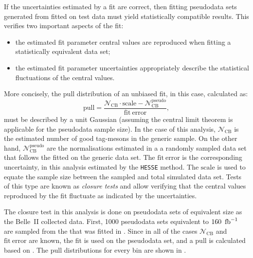 If the uncertainties estimated by a fit are correct, then fitting pseudodata sets generated from  fitted on test data must yield statistically compatible results.
This verifies two important aspects of the fit:
\begin{itemize}
    \item the estimated fit parameter central values are reproduced when fitting a statistically equivalent data set;
    \item the estimated fit parameter uncertainties appropriately describe the statistical fluctuations of the central values.
\end{itemize}

More concisely, the pull distribution of an unbiased fit, in this case, calculated as:
\begin{equation}\label{eq:toy_pull}
    \mathrm{pull} = \frac{\mathcal{N}_{\mathrm{CB}}\cdot \mathrm{scale} - \mathcal{N}_{\mathrm{CB}}^{\mathrm{pseudo}}}{\mathrm{fit~error}},
\end{equation}
must be described by a unit Gaussian (assuming the central limit theorem is applicable for the pseudodata sample size).
In the case of this analysis, $\mathcal{N}_{\mathrm{CB}}$ is the estimated number of good tag-\B mesons in the generic \MC sample.
On the other hand, $\mathcal{N}^{\mathrm{pseudo}}_{\mathrm{CB}}$ are the normalisations estimated in a a randomly sampled data set that follows the  fitted on the generic \MC data set.
The $\mathrm{fit~error}$ is the corresponding uncertainty, in this analysis estimated by the \texttt{HESSE} method.
The $\mathrm{scale}$ is used to equate the sample size between the sampled and total simulated data set.
Tests of this type are known as \textit{closure tests} and allow verifying that the central values reproduced by the fit fluctuate as indicated by the \PDF uncertainties.

The closure test in this analysis is done on pseudodata sets of equivalent size as the Belle~II collected data.
First, 1000 pseudodata sets equivalent to $\mathrm{160~\mbox{\,fb}^{-1}}$ are sampled from the \PDF that was fitted in .
Since in all of the cases $\mathcal{N}_{\mathrm{CB}}$ and $\mathrm{fit~error}$ are known, the \Mbc fit is used on the pseudodata set, and a $\mathrm{pull}$ is calculated based on .
The pull distributions for every \EB bin are shown in .

